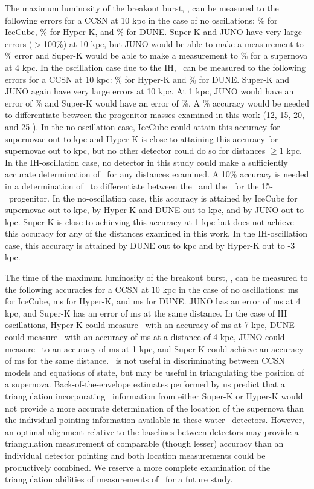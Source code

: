 The maximum luminosity of the breakout burst, \lmax, can be measured
to the following errors for a CCSN at 10 kpc in the case of no
oscillations: \% for
IceCube, \% for Hyper-K, and \% for DUNE.  
Super-K and JUNO have very large errors ($>$100\%) at
10 kpc, but JUNO would be able to make a measurement to \%
error and Super-K would be able to make a measurement to \%
for a supernova at 4 kpc.  
In the oscillation case due to the IH, \lmax\ can be measured to the
following errors for a CCSN at 10 kpc: \% for Hyper-K and
\% for DUNE.  Super-K and JUNO again have very
large errors at 10 kpc. At 1 kpc, JUNO would have an error of \% 
and Super-K would have an error of \%.
A \% accuracy would be needed to
differentiate between the progenitor masses examined in this work (12,
15, 20, and 25 \Msol).  In the no-oscillation case, 
IceCube could attain this accuracy for supernovae out
to  kpc and Hyper-K is close to attaining this accuracy 
for supernovae out to  kpc, but no other
detector could do so for distances ${\geq}1$ kpc.  In the
IH-oscillation case, no detector in this study could make a
sufficiently accurate determination of \lmax\ for any distances examined. 
A 10\% accuracy is
needed in a determination of \lmax\ 
to differentiate between the \ls\ and the \shen\ for the
15-\Msol\ progenitor.  In the no-oscillation case, 
this accuracy is attained by IceCube for supernovae
out to  kpc, by Hyper-K and DUNE out to  kpc, 
 and by JUNO out to  kpc.  Super-K is close to achieving this
 accuracy at 1 kpc but does not achieve this accuracy for any of the
 distances examined in this work.
In the IH-oscillation case, this accuracy is attained by DUNE out to
 kpc and by Hyper-K out to \abt 2-3 kpc. 

The time of the maximum luminosity of the breakout burst, \tmax, can
be measured to the following accuracies for a CCSN at 10 kpc in the
case of no oscillations: \abt 0.8
ms for IceCube,  ms for Hyper-K, and  ms for DUNE.
JUNO has an error of \abt 2 ms at 4 kpc, and Super-K has an error
of \abt 2.5 ms at the same distance.
In the case of IH oscillations, Hyper-K could measure \tmax\ with an
accuracy of \abt 3 ms at 7 kpc, DUNE could measure \tmax\ with an
accuracy of \abt 2 ms at a distance of 4 kpc, JUNO 
could measure \tmax\ to an accuracy of  ms at 1 kpc, and
Super-K could achieve an accuracy of \abt 2 ms for the same distance.
\tmax\ is
not useful in discriminating between CCSN models and equations of
state, but may be useful in triangulating the position of a 
supernova. Back-of-the-envelope estimates performed by us predict that
a triangulation incorporating \tmax\ information from either Super-K
or Hyper-K would not provide a more accurate determination of the
location of the supernova than the individual pointing information
available in these water \cer\ detectors.  However, an optimal
alignment relative to the baselines between detectors may provide a
triangulation measurement of comparable (though lesser) accuracy than an
individual detector pointing and both location measurements could be
productively combined.  We reserve a more complete examination of the
triangulation abilities of measurements of \tmax\ for a future study.


